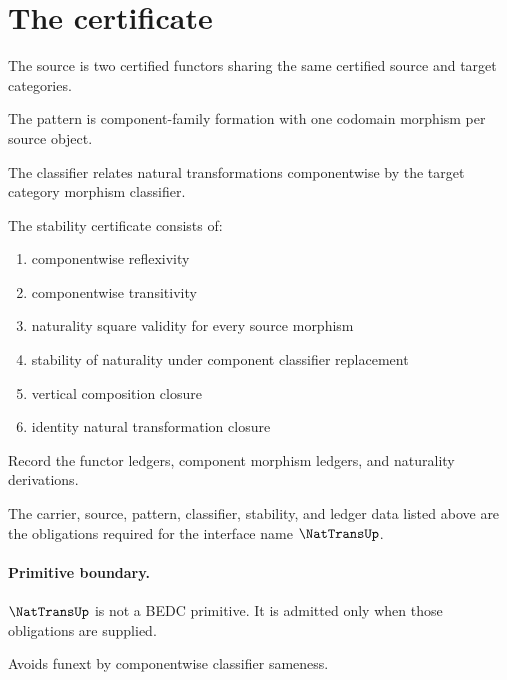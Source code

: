 \section{The certificate}

\begin{definition}
\label{def:nattrans-source-specification}
The source is two certified functors sharing the same certified source and target categories.
\end{definition}

\begin{definition}
\label{def:nattrans-pattern-specification}
The pattern is component-family formation with one codomain morphism per source object.
\end{definition}

\begin{definition}
\label{def:nattrans-classifier-specification}
The classifier relates natural transformations componentwise by the target category morphism classifier.
\end{definition}

\begin{definition}
\label{def:nattrans-stability-certificate}
The stability certificate consists of:
\begin{enumerate}
  \item componentwise reflexivity
  \item componentwise transitivity
  \item naturality square validity for every source morphism
  \item stability of naturality under component classifier replacement
  \item vertical composition closure
  \item identity natural transformation closure
\end{enumerate}
\end{definition}

\begin{definition}
\label{def:nattrans-ledger-policy}
Record the functor ledgers, component morphism ledgers, and naturality derivations.
\end{definition}

\begin{definition}
\label{def:nattrans-certificate-obligations}
The carrier, source, pattern, classifier, stability, and ledger data listed above are the obligations required for the interface name $\NatTransUp$.
\end{definition}

\paragraph{Primitive boundary.}
$\NatTransUp$ is not a BEDC primitive. It is admitted only when those obligations are supplied.

\begin{remark}
\label{rem:nattrans-zero-axiom-note}
Avoids funext by componentwise classifier sameness.
\end{remark}
